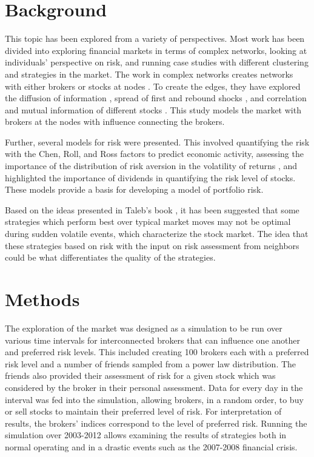 \documentclass[letterpaper, 10 pt, proceedings]{ieeetran}
\begin{document}
	\section{Background}\label{sec:background}
	This topic has been explored from a variety of perspectives. Most work has been divided into exploring financial markets in terms of complex networks, looking at individuals' perspective on risk, and running case studies with different clustering and strategies in the market. The work in complex networks creates networks with either brokers or stocks at nodes \cite{baydelli_hierarchicalmarket,kulmann_marketscomplexsystems,dimaggio_relevancebrokernetworks}. To create the edges, they have explored the diffusion of information \cite{dimaggio_relevancebrokernetworks}, spread of first and rebound shocks \cite{gai_contagion}, and correlation and mutual information of different stocks \cite{li_correlation, fiedor_networksmutualinformationrate}. This study models the market with brokers at the nodes with influence connecting the brokers. 
	
	Further, several models for risk were presented. This involved quantifying the risk with the Chen, Roll, and Ross factors \cite{cooper_realinvestmentandrisk} to predict economic activity, assessing the importance of the distribution of risk aversion in the volatility of returns \cite{lansing_riskaversion}, and highlighted the importance of dividends in quantifying the risk level of stocks. These models provide a basis for developing a model of portfolio risk.
	
	Based on the ideas presented in Taleb's book \cite{taleb_antifragile}, it has been suggested that some strategies which perform best over typical market moves may not be optimal during sudden volatile events, which characterize the stock market. The idea that these strategies based on risk with the input on risk assessment from neighbors could be what differentiates the quality of the strategies.
	
	
	\section{Methods}\label{sec:methods}
	The exploration of the market was designed as a simulation to be run over various time intervals for interconnected brokers that can influence one another and preferred risk levels. This included creating 100 brokers each with a preferred risk level and a number of friends sampled from a power law distribution. The friends also provided their assessment of risk for a given stock which was considered by the broker in their personal assessment. Data for every day in the interval was fed into the simulation, allowing brokers, in a random order, to buy or sell stocks to maintain their preferred level of risk. For interpretation of results, the brokers' indices correspond to the level of preferred risk. Running the simulation over 2003-2012 allows examining the results of strategies both in normal operating and in a drastic events such as the 2007-2008 financial crisis.
	
\end{document}
